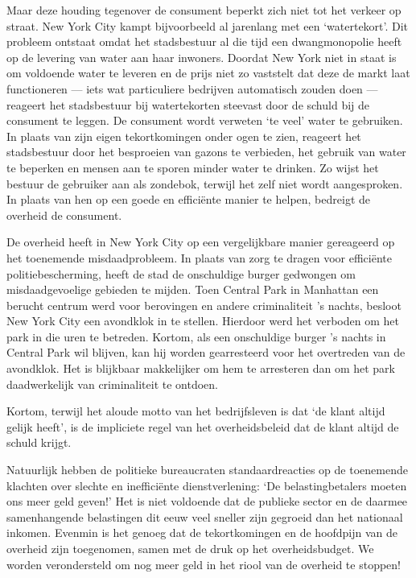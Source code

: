 \documentclass[
  a5paper,
  smalldemyvopaper,10pt,twoside,onecolumn,openright,extrafontsizes,hidelinks]{memoir}
\begin{document}
Maar deze houding tegenover de consument beperkt zich niet tot het
verkeer op straat. New York City kampt bijvoorbeeld al jarenlang met een
`watertekort'. Dit probleem ontstaat omdat het stadsbestuur al die tijd
een dwangmonopolie heeft op de levering van water aan haar inwoners.
Doordat New York niet in staat is om voldoende water te leveren en de
prijs niet zo vaststelt dat deze de markt laat functioneren --- iets wat
particuliere bedrijven automatisch zouden doen --- reageert het
stadsbestuur bij watertekorten steevast door de schuld bij de consument
te leggen. De consument wordt verweten `te veel' water te gebruiken. In
plaats van zijn eigen tekortkomingen onder ogen te zien, reageert het
stadsbestuur door het besproeien van gazons te verbieden, het gebruik
van water te beperken en mensen aan te sporen minder water te drinken.
Zo wijst het bestuur de gebruiker aan als zondebok, terwijl het zelf
niet wordt aangesproken. In plaats van hen op een goede en efficiënte
manier te helpen, bedreigt de overheid de consument.

De overheid heeft in New York City op een vergelijkbare manier
gereageerd op het toenemende misdaadprobleem. In plaats van zorg te
dragen voor efficiënte politiebescherming, heeft de stad de onschuldige
burger gedwongen om misdaadgevoelige gebieden te mijden. Toen Central
Park in Manhattan een berucht centrum werd voor berovingen en andere
criminaliteit 's nachts, besloot New York City een avondklok in te
stellen. Hierdoor werd het verboden om het park in die uren te betreden.
Kortom, als een onschuldige burger 's nachts in Central Park wil
blijven, kan hij worden gearresteerd voor het overtreden van de
avondklok. Het is blijkbaar makkelijker om hem te arresteren dan om het
park daadwerkelijk van criminaliteit te ontdoen.

Kortom, terwijl het aloude motto van het bedrijfsleven is dat `de klant
altijd gelijk heeft', is de impliciete regel van het overheidsbeleid dat
de klant altijd de schuld krijgt.

Natuurlijk hebben de politieke bureaucraten standaardreacties op de
toenemende klachten over slechte en inefficiënte dienstverlening: `De
belastingbetalers moeten ons meer geld geven!' Het is niet voldoende dat
de publieke sector en de daarmee samenhangende belastingen dit eeuw veel
sneller zijn gegroeid dan het nationaal inkomen. Evenmin is het genoeg
dat de tekortkomingen en de hoofdpijn van de overheid zijn toegenomen,
samen met de druk op het overheidsbudget. We worden verondersteld om nog
meer geld in het riool van de overheid te stoppen!
\end{document}
